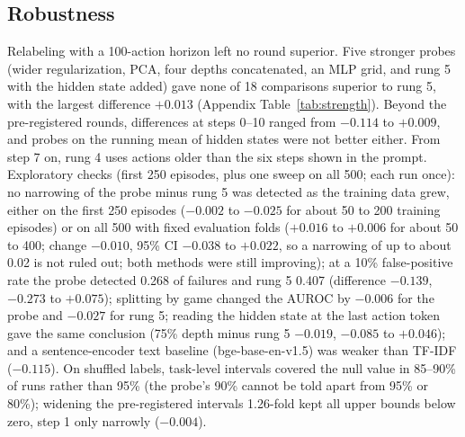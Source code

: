 \documentclass[10pt]{article}
\begin{document}
\subsection{Robustness}\label{sec:robust}
Relabeling with a 100-action horizon left no round superior. Five stronger probes (wider regularization, PCA, four depths concatenated, an MLP grid, and rung 5 with the hidden state added) gave none of 18 comparisons superior to rung 5, with the largest difference $+0.013$ (Appendix Table~\ref{tab:strength}).
Beyond the pre-registered rounds, differences at steps 0--10 ranged from $-0.114$ to $+0.009$, and probes on the running mean of hidden states were not better either. From step 7 on, rung 4 uses actions older than the six steps shown in the prompt.
Exploratory checks (first 250 episodes, plus one sweep on all 500; each run once): no narrowing of the probe minus rung 5 was detected as the training data grew, either on the first 250 episodes ($-0.002$ to $-0.025$ for about 50 to 200 training episodes) or on all 500 with fixed evaluation folds ($+0.016$ to $+0.006$ for about 50 to 400; change $-0.010$, 95\% CI $-0.038$ to $+0.022$, so a narrowing of up to about 0.02 is not ruled out; both methods were still improving); at a 10\% false-positive rate the probe detected 0.268 of failures and rung 5 0.407 (difference $-0.139$, $-0.273$ to $+0.075$); splitting by game changed the AUROC by $-0.006$ for the probe and $-0.027$ for rung 5; reading the hidden state at the last action token gave the same conclusion (75\% depth minus rung 5 $-0.019$, $-0.085$ to $+0.046$); and a sentence-encoder text baseline (bge-base-en-v1.5) was weaker than TF-IDF ($-0.115$). On shuffled labels, task-level intervals covered the null value in 85--90\% of runs rather than 95\% (the probe's 90\% cannot be told apart from 95\% or 80\%); widening the pre-registered intervals 1.26-fold kept all upper bounds below zero, step 1 only narrowly ($-0.004$).
\end{document}

